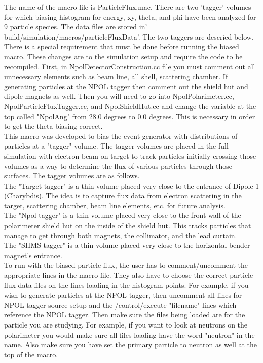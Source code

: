 \documentclass[10pt,titlepage]{article}
\begin{document}
The name of the macro file is ParticleFlux.mac.  There are two 'tagger' volumes for which biasing histogram for energy, xy, theta, and phi have been analyzed for 9 particle species.  The data files are stored in' build/simulation/macros/particleFluxData'.  The two taggers are descried below. There is a special requirement that must be done before running the biased macro.  These changes are to the simulation setup and require the code to be recompiled.  First, in NpolDetectorConstruction.cc file you must comment out all unnecessary elements such as beam line, all shell, scattering chamber. If generating particles at the NPOL tagger then comment out the shield hut and dipole magnets as well.  Then you will need to go into NpolPolarimeter.cc, NpolParticleFluxTagger.cc, and NpolShieldHut.cc and change the variable at the top called "NpolAng" from 28.0 degrees to 0.0 degrees.  This is necessary in order to get the theta biasing correct. \\

	This macro was developed to bias the event generator with distributions of particles at a "tagger" volume. The tagger volumes are placed in the full simulation with electron beam on target to track particles initially crossing those volumes as a way to determine the flux of various particles through those surfaces. The tagger volumes are as follows. \\  
	
	The "Target tagger" is a thin volume placed very close to the entrance of Dipole 1 (Charybdis). The idea is to capture flux data from electron scattering in the target, scattering chamber, beam line elements, etc. for future analysis. \\

	The "Npol tagger" is a thin volume placed very close to the front wall of the polarimeter shield hut on the inside of the shield hut.  This tracks particles that manage to get through both magnets, the collimator, and the lead curtain. \\

	The "SHMS tagger" is a thin volume placed very close to the horizontal bender magnet's entrance. \\

	To run with the biased particle flux, the user has to comment/uncomment the appropriate lines in the macro file.  They also have to choose the correct particle flux data files on the lines loading in the histogram points.  For example, if you wish to generate particles at the NPOL tagger, then uncomment all lines for NPOL tagger source setup and the /control/execute "filename" lines which reference the NPOL tagger.  Then make sure the files being loaded are for the particle you are studying.  For example, if you want to look at neutrons on the polarimeter you would make sure all files loading have the word "neutron" in the name. Also make sure you have set the primary particle to neutron as well at the top of the macro. \\
\end{document}
